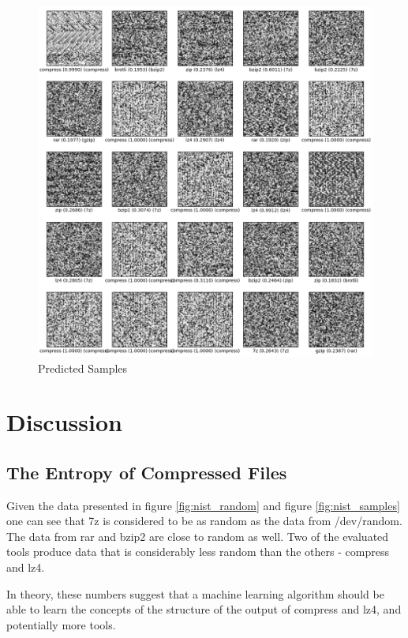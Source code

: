 \documentclass[conference]{IEEEtran}
\begin{document}
\begin{figure}[H]
    \centering
    \includegraphics[scale=0.25]{sample-predictions.png}
    \caption{Predicted Samples}
    \label{fig:samples}
\end{figure}

\section{Discussion}

\subsection{The Entropy of Compressed Files}

Given the data presented in figure \ref{fig:nist_random} and figure \ref{fig:nist_samples} one can see that 7z is considered to be as random as the data from /dev/random. The data from rar and bzip2 are close to random as well. Two of the evaluated tools produce data that is considerably less random than the others - compress and lz4.

In theory, these numbers suggest that a machine learning algorithm should be able to learn the concepts of the structure of the output of compress and lz4, and potentially more tools\cite{lakshmanan2021machine}.
\end{document}
